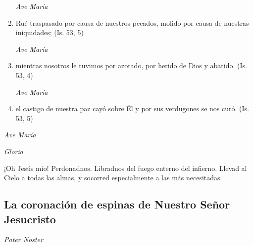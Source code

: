 \documentclass[a4paper,11pt, oneside]{report}
\begin{document}
\begin{enumerate}
          \textit{Ave María}

          \item Rué traspasado por causa de nuestros pecados, molido por causa de nuestras iniquidades; (Is. 53, 5)

          \textit{Ave María}

          \item mientras nosotros le tuvimos por azotado, por herido de Dios y abatido. (Is. 53, 4)

          \textit{Ave María}

          \item el castigo de nuestra paz cayó sobre Él y por sus verdugones se nos curó. (Is. 53, 5)

        \end{enumerate}

        \textit{Ave María} \par
        \indent\textit{Gloria} \par
        \indent¡Oh Jesús mío! Perdonadnos. Libradnos del fuego enterno del infierno. Llevad al Cielo a todas las almas, y socorred especialmente a las más 
        necesitadas
      
      \subsection*{La coronación de espinas de Nuestro Señor Jesucristo}
      
        \textit{Pater Noster}
\end{document}

